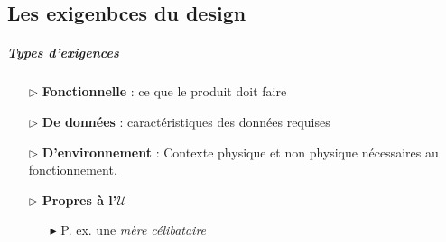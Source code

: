 \documentclass{report}
\begin{document}
\begin{multicols*}{3}
    \chapter{Les exigenbces du design}


    \paragraph{Types d'exigences}
    \begin{itemize}
      \item [$\rhd$ ] \textbf{Fonctionnelle} : ce que le produit 
        doit faire
       \item [$\rhd$ ] \textbf{De données} : caractéristiques des 
         données requises 
      \item [$\rhd$ ] \textbf{D'environnement}  :  Contexte
        physique 
        et non physique nécessaires au fonctionnement. 
      \item [$\rhd$ ] \textbf{Propres à l'$\mathcal{U}$}   
        \begin{itemize}
          \item [$\blacktriangleright$ ] P. ex. une 
            \textit{mère célibataire}  
        \end{itemize}

    \end{itemize}


    




     


    \end{multicols*}
\end{document}
